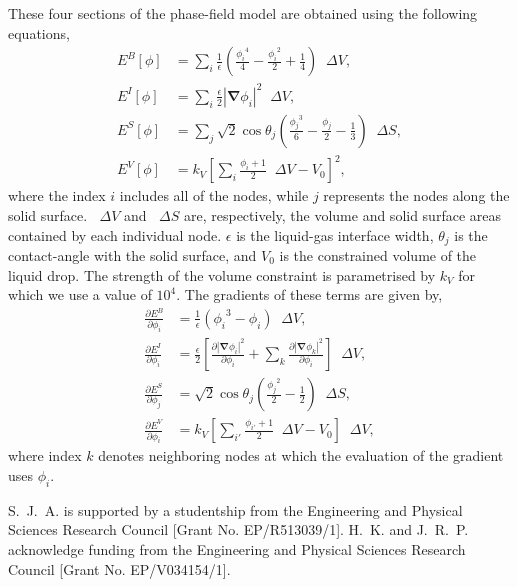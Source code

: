 \documentclass[twocolumn,10pt]{revtex4-2}
\newcommand{\abs}[1]{\left| #1 \right|}
\newcommand{\grad}{\bm{\nabla}}
\newcommand{\upDelta}{\mathop{}\!\Delta}
\begin{document}
These four sections of the phase-field model are obtained using the following equations,
\begin{align}
  E^B[\phi] &= \sum_i \frac{1}{\epsilon} \left( \frac{{\phi_i}^4}{4} - \frac{{\phi_i}^2}{2} + \frac{1}{4} \right) \upDelta V,\\
  E^I[\phi] &= \sum_i \frac{\epsilon}{2} \abs{\grad \phi_i}^2 \upDelta V,\\
  E^S[\phi] &= \sum_j \sqrt{2}\cos\theta_j \left( \frac{{\phi_j}^3}{6} - \frac{\phi_j}{2} - \frac{1}{3} \right) \upDelta S,\\
  E^V[\phi] &= k_V \left[ \sum_i \frac{\phi_i + 1}{2} \upDelta V - V_0 \right]^2,
\end{align}
where the index $i$ includes all of the nodes, while $j$ represents the nodes along the solid surface.
$\upDelta V$ and $\upDelta S$ are, respectively, the volume and solid surface areas contained by each individual node.
$\epsilon$ is the liquid-gas interface width, $\theta_j$ is the contact-angle with the solid surface, and $V_0$ is the constrained volume of the liquid drop.
The strength of the volume constraint is parametrised by $k_V$ for which we use a value of $10^4$.
The gradients of these terms are given by,
\begin{align}
  \frac{\partial E^B}{\partial \phi_i} &= \frac{1}{\epsilon} \left( {\phi_i}^3 - \phi_i \right) \upDelta V,\\
  \frac{\partial E^I}{\partial \phi_i} &= \frac{\epsilon}{2} \left[
    \frac{\partial \abs{\grad \phi_i}^2}{\partial \phi_i} +
    \sum_k\frac{\partial \abs{\grad \phi_k}^2}{\partial \phi_i} \right] \upDelta V,\\
  \frac{\partial E^S}{\partial \phi_j} &= \sqrt{2}\cos\theta_j \left( \frac{{\phi_j}^2}{2} - \frac{1}{2} \right) \upDelta S,\\
  \frac{\partial E^V}{\partial \phi_i} &= k_V \left[ \sum_{i'} \frac{\phi_{i'} + 1}{2} \upDelta V - V_0 \right] \upDelta V,
\end{align}
where index $k$ denotes neighboring nodes at which the evaluation of the gradient uses $\phi_i$.


\appendix

\begin{acknowledgments}
  S.~J.~A. is supported by a studentship from the Engineering and Physical Sciences Research Council [Grant No. EP/R513039/1].
  H.~K. and J.~R.~P. acknowledge funding from the Engineering and Physical Sciences Research Council [Grant No. EP/V034154/1].
\end{acknowledgments}
\end{document}
